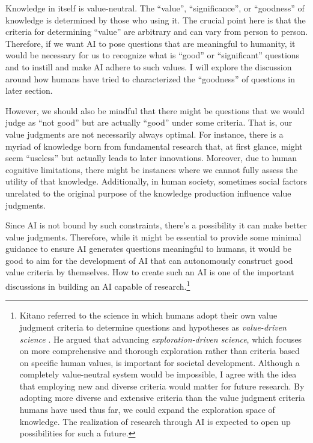 Knowledge in itself is value-neutral. The ``value'', ``significance'', or ``goodness'' of knowledge is determined by those who using it. The crucial point here is that the criteria for determining ``value'' are arbitrary and can vary from person to person. Therefore, if we want AI to pose questions that are meaningful to humanity, it would be necessary for us to recognize what is ``good'' or ``significant'' questions and to instill and make AI adhere to such values. I will explore the discussion around how humans have tried to characterized the ``goodness'' of questions in later section. 

However, we should also be mindful that there might be questions that we would judge as ``not good'' but are actually ``good'' under some criteria. That is, our value judgments are not necessarily always optimal. For instance, there is a myriad of knowledge born from fundamental research that, at first glance, might seem ``useless'' but actually leads to later innovations. Moreover, due to human cognitive limitations, there might be instances where we cannot fully assess the utility of that knowledge. Additionally, in human society, sometimes social factors unrelated to the original purpose of the knowledge production influence value judgments.

Since AI is not bound by such constraints, there's a possibility it can make better value judgments. Therefore, while it might be essential to provide some minimal guidance to ensure AI generates questions meaningful to humans, it would be good to aim for the development of AI that can autonomously construct good value criteria by themselves. How to create such an AI is one of the important discussions in building an AI capable of research.\footnote{
Kitano referred to the science in which humans adopt their own value judgment criteria to determine questions and hypotheses as \textit{value-driven science} \cite{kitano2021nobel}. He argued that advancing \textit{exploration-driven science}, which focuses on more comprehensive and thorough exploration rather than criteria based on specific human values, is important for societal development. Although a completely value-neutral system would be impossible, I agree with the idea that employing new and diverse criteria would matter for future research. By adopting more diverse and extensive criteria than the value judgment criteria humans have used thus far, we could expand the exploration space of knowledge. The realization of research through AI is expected to open up possibilities for such a future.
}

